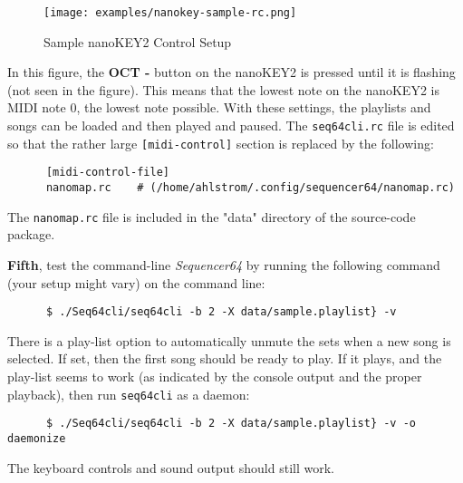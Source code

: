 \begin{figure}[H]
   \centering 
   \texttt{[image: examples/nanokey-sample-rc.png]}
   \caption{Sample nanoKEY2 Control Setup}
   \label{fig:headless_nanokey2_setup}
\end{figure}

   In this figure, the \textbf{OCT -} button on the nanoKEY2 is pressed until
   it is flashing (not seen in the figure).
   This means that the lowest note on the nanoKEY2 is MIDI note 0, the lowest
   note possible.  With these settings, the playlists and songs can be loaded
   and then played and paused.
   The \texttt{seq64cli.rc} file is edited so that the rather large
   \texttt{[midi-control]} section is replaced by the following:

   \begin{verbatim}
      [midi-control-file]
      nanomap.rc    # (/home/ahlstrom/.config/sequencer64/nanomap.rc)
   \end{verbatim}

   The \texttt{nanomap.rc} file is included in the "data" directory of the
   source-code package.

   \textbf{Fifth}, test the command-line \textsl{Sequencer64} by running the
   following command (your setup might vary) on the command line:

   \begin{verbatim}
      $ ./Seq64cli/seq64cli -b 2 -X data/sample.playlist} -v
   \end{verbatim}

   There is a play-list option to automatically unmute the sets when a new song
   is selected.  If set, then the first song should be ready to play.
   If it plays, and the play-list seems to work (as indicated by the console
   output and the proper playback), then run \texttt{seq64cli} as a daemon:

   \begin{verbatim}
      $ ./Seq64cli/seq64cli -b 2 -X data/sample.playlist} -v -o daemonize
   \end{verbatim}

   The keyboard controls and sound output should still work.

